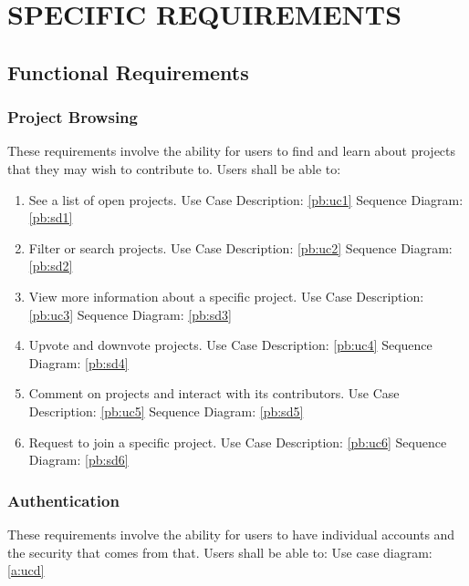 \documentclass[twoside,letterpaper]{article}
\begin{document}
\clearpage\section[SPECIFIC REQUIREMENTS]{\rmfamily\bfseries\color{black} SPECIFIC REQUIREMENTS}
\hypertarget{RefHeading20459017292}{}{\color{black}

\subsection{Functional Requirements}

\subsubsection{Project Browsing}

These requirements involve the ability for users to find and learn about projects that they may wish to contribute to. Users shall be able to:

\begin{enumerate}
	\item See a list of open projects.
		\subitem Use Case Description: \ref{pb:uc1}
		\subitem Sequence Diagram:  \ref{pb:sd1}
	\item Filter or search projects.
		\subitem Use Case Description: \ref{pb:uc2}
		\subitem Sequence Diagram:  \ref{pb:sd2}
	\item View more information about a specific project.
		\subitem Use Case Description: \ref{pb:uc3}
		\subitem Sequence Diagram:  \ref{pb:sd3}
	\item Upvote and downvote projects.
		\subitem Use Case Description: \ref{pb:uc4}
		\subitem Sequence Diagram:  \ref{pb:sd4}
	\item Comment on projects and interact with its contributors.
		\subitem Use Case Description: \ref{pb:uc5}
		\subitem Sequence Diagram:  \ref{pb:sd5}
	\item Request to join a specific project.
		\subitem Use Case Description: \ref{pb:uc6}
		\subitem Sequence Diagram:  \ref{pb:sd6}
\end{enumerate}

\subsubsection{Authentication}
These requirements involve the ability for users to have individual accounts and the security that comes from that. Users shall be able to: \newline
\noindent Use case diagram: \ref{a:ucd}


}
\end{document}
